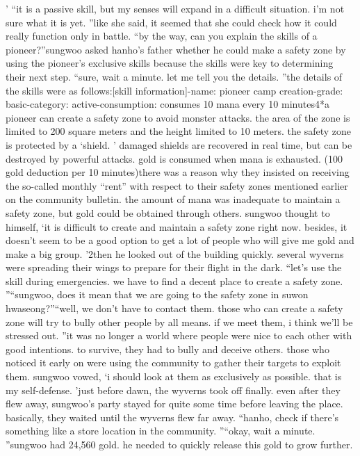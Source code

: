 ’
“it is a passive skill, but my senses will expand in a difficult situation.
 i’m not sure what it is yet.
”like she said, it seemed that she could check how it could really function only in battle.
“by the way, can you explain the skills of a pioneer?”sungwoo asked hanho’s father whether he could make a safety zone by using the pioneer’s exclusive skills because the skills were key to determining their next step.
“sure, wait a minute.
 let me tell you the details.
”the details of the skills were as follows:[skill information]-name: pioneer camp creation-grade: basic-category: active-consumption: consumes 10 mana every 10 minutes4*a pioneer can create a safety zone to avoid monster attacks.
 the area of the zone is limited to 200 square meters and the height limited to 10 meters.
 the safety zone is protected by a ‘shield.
’ damaged shields are recovered in real time, but can be destroyed by powerful attacks.
 gold is consumed when mana is exhausted.
 (100 gold deduction per 10 minutes)there was a reason why they insisted on receiving the so-called monthly “rent” with respect to their safety zones mentioned earlier on the community bulletin.
 the amount of mana was inadequate to maintain a safety zone, but gold could be obtained through others.
sungwoo thought to himself, ‘it is difficult to create and maintain a safety zone right now.
 besides, it doesn’t seem to be a good option to get a lot of people who will give me gold and make a big group.
’2then he looked out of the building quickly.
several wyverns were spreading their wings to prepare for their flight in the dark.
“let’s use the skill during emergencies.
 we have to find a decent place to create a safety zone.
”“sungwoo, does it mean that we are going to the safety zone in suwon hwaseong?”“well, we don’t have to contact them.
 those who can create a safety zone will try to bully other people by all means.
 if we meet them, i think we’ll be stressed out.
”it was no longer a world where people were nice to each other with good intentions.
 to survive, they had to bully and deceive others.
 those who noticed it early on were using the community to gather their targets to exploit them.
sungwoo vowed, ‘i should look at them as exclusively as possible.
 that is my self-defense.
’just before dawn, the wyverns took off finally.
even after they flew away, sungwoo’s party stayed for quite some time before leaving the place.
 basically, they waited until the wyverns flew far away.
“hanho, check if there’s something like a store location in the community.
”“okay, wait a minute.
”sungwoo had 24,560 gold.
 he needed to quickly release this gold to grow further.
